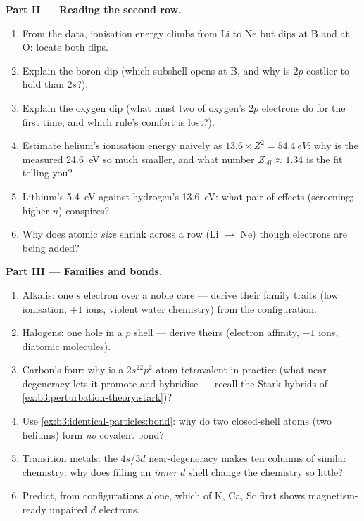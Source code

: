 \begin{problem}
\medskip\noindent\textbf{Part II --- Reading the second row.}
\begin{enumerate}[resume]
  \item From the data, ionisation energy climbs from Li to Ne but
        dips at B and at O: locate both dips.
  \item Explain the boron dip (which subshell opens at B, and why
        is $2p$ costlier to hold than $2s$?).
  \item Explain the oxygen dip (what must two of oxygen's $2p$
        electrons do for the first time, and which rule's comfort
        is lost?).
  \item Estimate helium's ionisation energy naively as
        $13.6 \times Z^2 = \qty{54.4}{eV}$: why is the measured
        \qty{24.6}{eV} so much smaller, and what number
        $Z_{\text{eff}} \approx 1.34$ is the fit telling you?
  \item Lithium's \qty{5.4}{eV} against hydrogen's \qty{13.6}{eV}:
        what pair of effects (screening; higher $n$) conspires?
  \item Why does atomic \emph{size} shrink across a row
        (Li $\to$ Ne) though electrons are being added?
\end{enumerate}

\medskip\noindent\textbf{Part III --- Families and bonds.}
\begin{enumerate}[resume]
  \item Alkalis: one $s$ electron over a noble core --- derive
        their family traits (low ionisation, $+1$ ions, violent
        water chemistry) from the configuration.
  \item Halogens: one hole in a $p$ shell --- derive theirs
        (electron affinity, $-1$ ions, diatomic molecules).
  \item Carbon's four: why is a $2s^22p^2$ atom tetravalent in
        practice (what near-degeneracy lets it promote and
        hybridise --- recall the Stark hybrids of
        \cref{ex:b3:perturbation-theory:stark})?
  \item Use \cref{ex:b3:identical-particles:bond}: why do two
        closed-shell atoms (two heliums) form \emph{no} covalent
        bond?
  \item Transition metals: the $4s$/$3d$ near-degeneracy makes ten
        columns of similar chemistry: why does filling an
        \emph{inner} $d$ shell change the chemistry so little?
  \item Predict, from configurations alone, which of K, Ca, Sc
        first shows magnetism-ready unpaired $d$ electrons.
\end{enumerate}


\end{problem}
